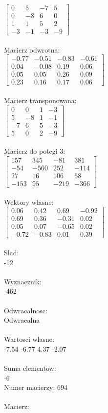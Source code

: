 \documentclass[a4paper,12pt]{article}
\begin{document}
$\begin{bmatrix} 0&5&-7&5\\0&-8&6&0\\1&1&5&2\\-3&-1&-3&-9 \end{bmatrix}$
\\
\\
Macierz odwrotna:\\

$\begin{bmatrix} -0.77&-0.51&-0.83&-0.61\\0.04&-0.08&0.19&0.06\\0.05&0.05&0.26&0.09\\0.23&0.16&0.17&0.06 \end{bmatrix}$
\\
\\
Macierz transponowana:\\

$\begin{bmatrix} 0&0&1&-3\\5&-8&1&-1\\-7&6&5&-3\\5&0&2&-9 \end{bmatrix}$
\\
\\
Macierz do potegi 3:\\

$\begin{bmatrix} 157&345&-81&381\\-54&-560&252&-114\\27&16&106&58\\-153&95&-219&-366 \end{bmatrix}$
\\
\\
Wektory wlasne:\\

$\begin{bmatrix} 0.06&0.42&0.69&-0.92\\0.69&0.36&-0.31&0.02\\0.05&0.07&-0.65&0.02\\-0.72&-0.83&0.01&0.39 \end{bmatrix}$
\\
\\
Slad:\\
-12
\\
\\
Wyznacznik:\\
-462
\\
\\
Odwracalnosc:\\
Odwracalna
\\
\\
Wartosci wlasne:\\
-7.54 -6.77 4.37 -2.07
\\
\\
Suma elementow:\\
-6
\\
\newpage
Numer macierzy:
694
\\
\\
Macierz:\\
\end{document}
